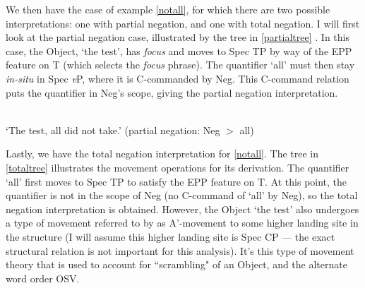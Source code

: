 \documentclass{article}
\begin{document}
We then have the case of example \ref{notall}, for which there are two possible interpretations: one with partial negation, and one with total negation. I will first look at the partial negation case, illustrated by the tree in \ref{partialtree} \citep{Miyagawa2001}. In this case, the Object, `the test', has \textit{focus} and moves to Spec TP by way of the EPP feature on T (which selects the \textit{focus} phrase). The quantifier `all' must then stay \textit{in-situ} in Spec \textit{v}P, where it is C-commanded by Neg. This C-command relation puts the quantifier in Neg's scope, giving the partial negation interpretation.

\begin{exe}
    \ex
    \label{partialtree}
\\
`The test, all did not take.' (partial negation: Neg $>$ all)
\end{exe}

Lastly, we have the total negation interpretation for \ref{notall}. The tree in \ref{totaltree} \citep{Miyagawa2001} illustrates the movement operations for its derivation. The quantifier `all' first moves to Spec TP to satisfy the EPP feature on T. At this point, the quantifier is not in the scope of Neg (no C-command of `all' by Neg), so the total negation interpretation is obtained. However, the Object `the test' also undergoes a type of movement referred to by \cite{Miyagawa2001} as A'-movement to some higher landing site in the structure (I will assume this higher landing site is Spec CP — the exact structural relation is not important for this analysis). It's this type of movement theory that is used to account for ``scrambling" of an Object, and the alternate word order OSV.
\end{document}
